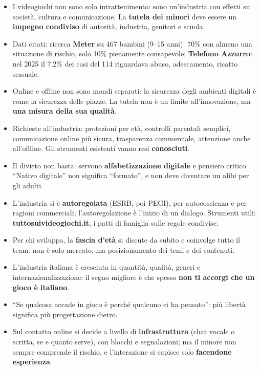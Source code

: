 \begin{itemize}
  \item I videogiochi non sono solo intrattenimento: sono un'industria con
        effetti su società, cultura e comunicazione. La \textbf{tutela dei
        minori} deve essere un \textbf{impegno condiviso} di autorità,
        industria, genitori e scuola.
  \item Dati citati: ricerca \textbf{Meter} su 467 bambini (9--15 anni): 70\%
        con almeno una situazione di rischio, solo 10\% pienamente consapevole;
        \textbf{Telefono Azzurro}: nel 2025 il 7,2\% dei casi del 114 riguardava
        abuso, adescamento, ricatto sessuale.
  \item Online e offline non sono mondi separati: la sicurezza degli ambienti
        digitali è come la sicurezza delle piazze. La tutela non è un limite
        all'innovazione, ma \textbf{una misura della sua qualità}.
  \item Richieste all'industria: protezioni per età, controlli parentali
        semplici, comunicazione online più sicura, trasparenza commerciale,
        attenzione anche all'offline. Gli strumenti esistenti vanno resi
        \textbf{conosciuti}.
  \item Il divieto non basta: servono \textbf{alfabetizzazione digitale} e
        pensiero critico. ``Nativo digitale'' non significa ``formato'', e non
        deve diventare un alibi per gli adulti.
  \item L'industria si è \textbf{autoregolata} (ESRB, poi PEGI), per
        autocoscienza e per ragioni commerciali; l'autoregolazione è l'inizio di
        un dialogo. Strumenti utili: \textbf{tuttosuivideogiochi.it}, i patti
        di famiglia sulle regole condivise.
  \item Per chi sviluppa, la \textbf{fascia d'età} si discute da subito e
        coinvolge tutto il team: non è solo mercato, ma posizionamento dei temi
        e dei contenuti.
  \item L'industria italiana è cresciuta in quantità, qualità, generi e
        internazionalizzazione: il segno migliore è che spesso \textbf{non ti
        accorgi che un gioco è italiano}.
  \item ``Se qualcosa accade in gioco è perché qualcuno ci ha pensato'': più
        libertà significa più progettazione dietro.
  \item Sul contatto online si decide a livello di \textbf{infrastruttura}
        (chat vocale o scritta, se e quanto serve), con blocchi e segnalazioni;
        ma il minore non sempre comprende il rischio, e l'interazione si capisce
        solo \textbf{facendone esperienza}.
\end{itemize}
